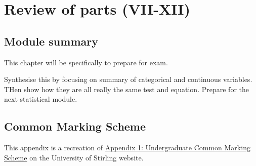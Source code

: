 \documentclass[
]{scrbook}
\begin{document}
\hypertarget{part-review-of-parts-vii-xii}{%
\part{Review of parts (VII-XII)}\label{part-review-of-parts-vii-xii}}

\hypertarget{Week13}{%
\chapter*{Module summary}\label{Week13}}

This chapter will be specifically to prepare for exam.

Synthesise this by focusing on summary of categorical and continuous variables.
THen show how they are all really the same test and equation.
Prepare for the next statistical module.

\hypertarget{appendix-appendix}{%
\appendix}


\hypertarget{appendexA_CMS}{%
\chapter{Common Marking Scheme}\label{appendexA_CMS}}

This appendix is a recreation of \href{https://www.stir.ac.uk/about/professional-services/student-academic-and-corporate-services/academic-registry/academic-policy-and-practice/quality-handbook/assessment-policy-and-procedure/appendix-1-undergraduate-common-marking-scheme/}{Appendix 1: Undergraduate Common Marking Scheme} on the University of Stirling website.
\end{document}
